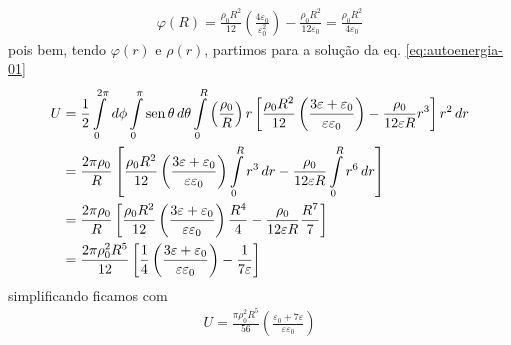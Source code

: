 \begin{prob}
\begin{sol}
\begin{enumerate}[label=\alph *)]
\begin{align}
						\varphi(R)=\frac{\rho_0 R^{2}}{12}\left(\frac{4 \varepsilon_0}{\varepsilon^{2}_0}\right)-\frac{\rho_0 R^{2}}{12 \varepsilon_0}=\frac{\rho_0 R^{2}}{4 \varepsilon_0}
				\end{align}
				pois bem, tendo $\varphi(r)$ e $\rho(r)$, partimos para a solução da eq. \eqref{eq:autoenergia-01}
				\begin{align}
				 \begin{split}
					 U &= \frac{1}{2}\int\limits_{0}^{2 \pi}\,d{\phi}\int\limits_{0}^{\pi}\operatorname{sen} \theta\,d{\theta}\int\limits_{0}^{R}\left(\frac{\rho_0}{R}\right)r \left[\frac{\rho_0 R^{2}}{12}\left(\frac{3 \varepsilon+\varepsilon_0}{\varepsilon \varepsilon_0}\right)-\frac{\rho_0}{12 \varepsilon R}r^{3}\right]r^{2}\,d{r}\\
						 &= \frac{2 \pi\rho_0}{R}\left[\frac{\rho_0 R^{2}}{12}\left(\frac{3 \varepsilon+ \varepsilon_0}{\varepsilon \varepsilon_0}\right)\int\limits_{0}^{R}r^{3}\,d{r}-\frac{\rho_0}{12 \varepsilon R}\int\limits_{0}^{R}r^{6}\,d{r}\right]\\
						 &= \frac{2 \pi \rho_0}{R}\left[\frac{\rho_0 R^{2}}{12}\left(\frac{3 \varepsilon+ \varepsilon_0}{\varepsilon \varepsilon_0}\right)\frac{R^{4}}{4}-\frac{\rho_0}{12 \varepsilon R}\frac{R^{7}}{7}\right]\\
						 &= \frac{2 \pi \rho_0^{2} R^{5}}{12}\left[\frac{1}{4}\left(\frac{3 \varepsilon+ \varepsilon_0}{\varepsilon \varepsilon_0}\right)-\frac{1}{7 \varepsilon}\right]
				 \end{split}
				\end{align}
				simplificando ficamos com
				\begin{align}
						\boxed{
							U=\frac{\pi \rho_0^{2} R^{5}}{56}\left(\frac{\varepsilon_0+7 \varepsilon}{\varepsilon \varepsilon_0}\right)
						}
				\end{align}


\end{enumerate}
\end{sol}
\end{prob}
